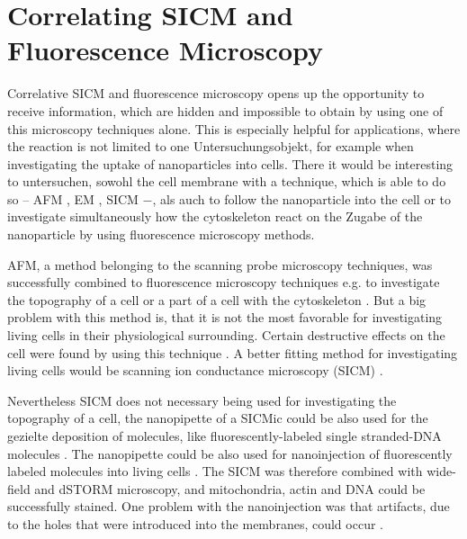 \section{Correlating SICM and Fluorescence Microscopy}
\label{sec:correlating-sicm-and-fm}
Correlative SICM and fluorescence microscopy opens up the opportunity to receive information, 
which are hidden and impossible to obtain by using one of this microscopy techniques alone. 
This is especially helpful for applications, where the reaction is not limited to one Untersuchungsobjekt, %
for example when investigating the uptake of nanoparticles into cells. There it would be interesting to
untersuchen, sowohl %
the cell membrane with a technique, which is able to do so $–$ AFM \cite{}, EM \cite{}, SICM \cite{Hansma1989} $-$, 
als auch %
to follow the nanoparticle into the cell or to investigate simultaneously how the cytoskeleton 
react on the Zugabe %
of the nanoparticle by using fluorescence microscopy methods.

AFM, a method belonging to the scanning probe microscopy techniques, was successfully
combined to fluorescence microscopy techniques e.g. to investigate the topography of a 
cell or a part of a cell with the cytoskeleton \cite{Laishram2009,Liu2020}. But a big problem 
with this method is, that it is not the most favorable for investigating living cells in their
physiological surrounding. Certain destructive effects on the cell were found by using this 
technique \cite{}. A better fitting method for investigating living cells would be scanning 
ion conductance microscopy (SICM) \cite{Hansma1989}. 


Nevertheless SICM does not necessary being used for investigating the topography of a cell, 
the nanopipette of a SICMic could be also used for the gezielte %
deposition of molecules, like fluorescently-labeled single stranded-DNA molecules 
\cite{Ying2002,Hennig2015}. The nanopipette could be also used for nanoinjection 
of fluorescently labeled molecules into living cells \cite{Hennig2015_nanoinj}. 
The SICM was therefore combined with wide-field and dSTORM microscopy, and mitochondria, 
actin and DNA could be successfully stained. One problem with the nanoinjection was that 
artifacts, due to the holes that were introduced into the membranes, could occur \cite{Hennig2015_nanoinj}.

